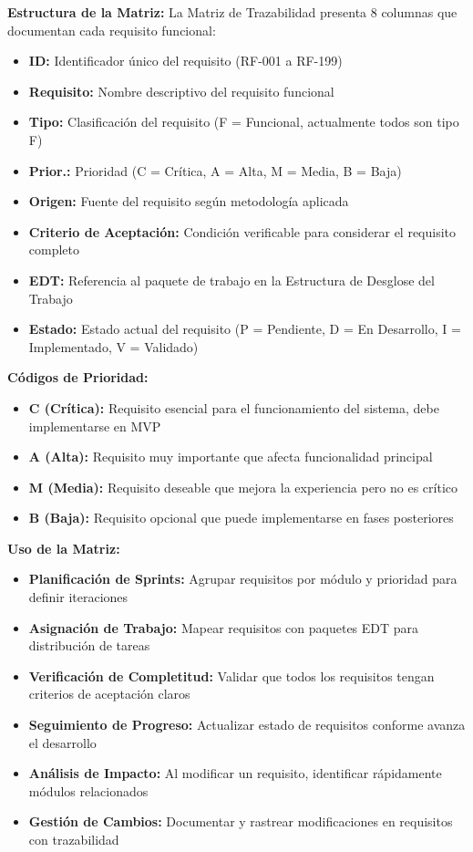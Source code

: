 \documentclass[12pt,a4paper]{article}
\begin{document}
\textbf{Estructura de la Matriz:}
La Matriz de Trazabilidad presenta 8 columnas que documentan cada requisito funcional:
\begin{itemize}[noitemsep]
    \item \textbf{ID:} Identificador único del requisito (RF-001 a RF-199)
    \item \textbf{Requisito:} Nombre descriptivo del requisito funcional
    \item \textbf{Tipo:} Clasificación del requisito (F = Funcional, actualmente todos son tipo F)
    \item \textbf{Prior.:} Prioridad (C = Crítica, A = Alta, M = Media, B = Baja)
    \item \textbf{Origen:} Fuente del requisito según metodología aplicada
    \item \textbf{Criterio de Aceptación:} Condición verificable para considerar el requisito completo
    \item \textbf{EDT:} Referencia al paquete de trabajo en la Estructura de Desglose del Trabajo
    \item \textbf{Estado:} Estado actual del requisito (P = Pendiente, D = En Desarrollo, I = Implementado, V = Validado)
\end{itemize}



\textbf{Códigos de Prioridad:}
\begin{itemize}[noitemsep]
    \item \textbf{C (Crítica):} Requisito esencial para el funcionamiento del sistema, debe implementarse en MVP
    \item \textbf{A (Alta):} Requisito muy importante que afecta funcionalidad principal
    \item \textbf{M (Media):} Requisito deseable que mejora la experiencia pero no es crítico
    \item \textbf{B (Baja):} Requisito opcional que puede implementarse en fases posteriores
\end{itemize}


\textbf{Uso de la Matriz:}
\begin{itemize}[noitemsep]
    \item \textbf{Planificación de Sprints:} Agrupar requisitos por módulo y prioridad para definir iteraciones
    \item \textbf{Asignación de Trabajo:} Mapear requisitos con paquetes EDT para distribución de tareas
    \item \textbf{Verificación de Completitud:} Validar que todos los requisitos tengan criterios de aceptación claros
    \item \textbf{Seguimiento de Progreso:} Actualizar estado de requisitos conforme avanza el desarrollo
    \item \textbf{Análisis de Impacto:} Al modificar un requisito, identificar rápidamente módulos relacionados
    \item \textbf{Gestión de Cambios:} Documentar y rastrear modificaciones en requisitos con trazabilidad
\end{itemize}
\end{document}
